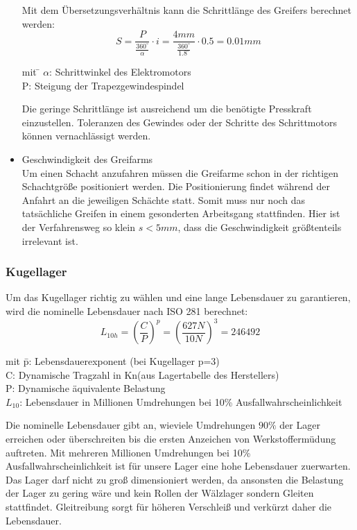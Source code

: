 \documentclass{scrartcl}
\begin{document}
\begin{itemize}
Mit dem Übersetzungsverhältnis kann die Schrittlänge des Greifers berechnet werden:
\[S=\frac{P}{\frac{360^\circ}{\alpha}}\cdot i=\frac{4mm}{\frac{360^\circ}{1.8^\circ}}\cdot 0.5=0.01mm\]


\begin{tabbing}
mit \= $\alpha$: Schrittwinkel des Elektromotors\\
    \> P: Steigung der Trapezgewindespindel
\end{tabbing}

Die geringe Schrittlänge ist ausreichend um die benötigte Presskraft einzustellen. Toleranzen des Gewindes oder der Schritte des Schrittmotors können vernachlässigt werden.
\newline

 
\item Geschwindigkeit des Greifarms\\

Um einen Schacht anzufahren müssen die Greifarme schon in der richtigen Schachtgröße positioniert werden. 
Die Positionierung findet während der Anfahrt an die jeweiligen Schächte statt. Somit muss nur noch das tatsächliche Greifen in einem gesonderten Arbeitsgang stattfinden. Hier ist der Verfahrensweg so klein $s<5mm$, dass die Geschwindigkeit größtenteils irrelevant ist. 

\end{itemize}



\subsubsection{Kugellager}

Um das Kugellager richtig zu wählen und eine lange Lebensdauer zu garantieren, wird die nominelle Lebensdauer nach 
ISO 281 berechnet:\\

\[L_{10h}=(\frac{C}{P})^p=(\frac{627N}{10N})^3 = 246492\]	


\begin{tabbing}
mit \= p: Lebensdauerexponent (bei Kugellager p=3)\\
    \> C: Dynamische Tragzahl in Kn(aus Lagertabelle des Herstellers) \\
    \> P: Dynamische äquivalente Belastung\\
		\> $L_{10}$: Lebensdauer in Millionen Umdrehungen bei 10\% Ausfallwahrscheinlichkeit
\end{tabbing}


Die nominelle Lebensdauer gibt an, wieviele Umdrehungen $90\%$ der Lager erreichen oder überschreiten bis die ersten Anzeichen von Werkstoffermüdung auftreten. Mit mehreren Millionen Umdrehungen bei 10\% Ausfallwahrscheinlichkeit ist für unsere Lager eine hohe Lebensdauer zuerwarten. Das Lager darf nicht zu groß dimensioniert werden, da ansonsten die Belastung der Lager zu gering wäre und kein Rollen der Wälzlager sondern Gleiten stattfindet. Gleitreibung sorgt für höheren Verschleiß und verkürzt daher die Lebensdauer.\\
\end{document}

